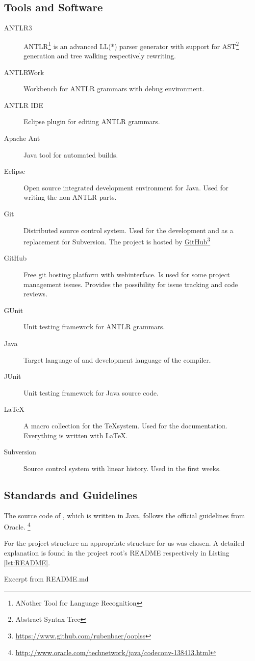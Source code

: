 \subsection{Tools and Software}
\begin{description}
	\item[ANTLR3] ANTLR\footnote{ANother Tool for Language
	Recognition} is an advanced LL(*) parser generator with support
	for AST\footnote{Abstract Syntax Tree} generation and tree
	walking respectively rewriting.
	\item[ANTLRWork] Workbench for ANTLR grammars with debug
	environment.
	\item[ANTLR IDE] Eclipse plugin for editing ANTLR grammars.
	\item[Apache Ant] Java tool for automated builds.
	\item[Eclipse] Open source integrated development environment
	for Java. Used for writing the non-ANTLR parts.
	\item[Git] Distributed source control system. Used for the
	development and as a replacement for Subversion. The project is
	hosted by \href{https://www.github.com/rubenbaer/ooplss}{GitHub}\footnote{\href{https://www.github.com/rubenbaer/ooplss}{https://www.github.com/rubenbaer/ooplss}}
	\item[GitHub] Free git hosting platform with webinterface. Is
	used for some project management issues. Provides the possibility
	for issue tracking and code reviews.
	\item[GUnit] Unit testing framework for ANTLR grammars.
	\item[Java] Target language of \ooplss and development language
	of the compiler.
	\item[JUnit] Unit testing framework for Java source code.
	\item[\LaTeX] A macro collection for the \TeX system. Used for
	the documentation. Everything is written with \LaTeX.
	\item[Subversion] Source control system with linear history. Used
	in the first weeks.
\end{description}

\subsection{Standards and Guidelines}
The source code of \ooplss, which is written in Java, follows the official
guidelines from Oracle.
\footnote{\href{http://www.oracle.com/technetwork/java/codeconv-138413.html}{http://www.oracle.com/technetwork/java/codeconv-138413.html}}

For the project structure an appropriate structure for us was chosen.
A detailed explanation is found in the project root's README
respectively in Listing \ref{lst:README}.

\begin{listing}
	\caption{Excerpt from README.md}
	\label{lst:README}
\end{listing}
